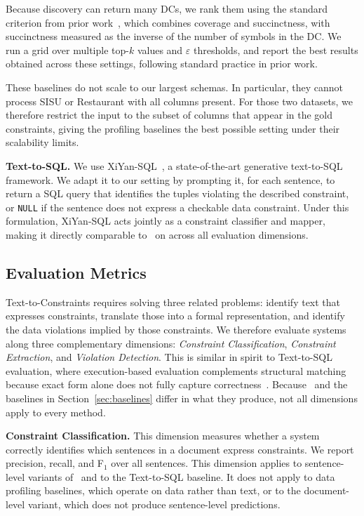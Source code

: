 Because discovery can return many DCs, we rank them using the standard
criterion from prior work~\cite{chu2013discovering}, which combines coverage
and succinctness, with succinctness measured as the inverse of the number of
symbols in the DC. We run a grid over multiple top-$k$ values and
$\varepsilon$ thresholds, and report the best results obtained across these settings, following standard practice in prior work.

These baselines do not scale to our largest schemas. In particular, they
cannot process SISU or Restaurant with all columns present. For those two
datasets, we therefore restrict the input to the subset of columns that appear
in the gold constraints, giving the profiling baselines the best possible
setting under their scalability limits.


\smallskip\noindent\textbf{Text-to-SQL.}
We use XiYan-SQL~\cite{XiYanSQL}, a state-of-the-art generative text-to-SQL
framework. We adapt it to our setting by prompting it, for each sentence, to
return a SQL query that identifies the tuples violating the described
constraint, or \texttt{NULL} if the sentence does not express a checkable data
constraint. Under this formulation, XiYan-SQL acts jointly as a constraint
classifier and mapper, making it directly comparable to \system\ on  across all
evaluation dimensions.


\subsection{Evaluation Metrics}
\label{sec:metrics}

Text-to-Constraints requires solving three related problems: identify
text that expresses constraints, translate those into a formal
representation, and identify the data violations implied by those constraints.
We therefore evaluate systems along three complementary dimensions:
\textit{Constraint Classification}, \textit{Constraint Extraction}, and
\textit{Violation Detection}. This is similar in spirit to Text-to-SQL evaluation, where
execution-based evaluation complements structural matching because exact form
alone does not fully capture correctness~\cite{zhong-etal-2020-semantic}. Because \system\ and the
baselines in Section~\ref{sec:baselines} differ in what they produce, not all
dimensions apply to every method.

\smallskip\noindent\textbf{Constraint Classification.}
This dimension measures whether a system correctly identifies which sentences
in a document express constraints. We report precision, recall, and F$_1$
over all sentences. This dimension applies to sentence-level variants of
\system\ and to the Text-to-SQL baseline. It does not apply to data profiling
baselines, which operate on data rather than text, or to the document-level
variant, which does not produce sentence-level predictions.

